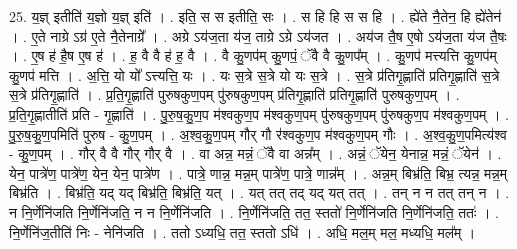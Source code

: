 \documentclass[17pt]{extarticle}
\begin{document}
25. य॒ज्ञ् इतीति॑ य॒ज्ञो य॒ज्ञ् इति॑ । . इति॒ स स इतीति॒ सः । . स हि हि स स हि । . ह्ये॑ते नै॒तेन॒ हि ह्ये॑तेन॑ । . ए॒ते नाग्रे ऽग्र॑ ए॒ते नै॒तेनाग्रे᳚ । . अग्रे ऽय॑ज॒ता य॑ज॒ ताग्रे ऽग्रे ऽय॑जत । . अय॑ज तै॒ष ए॒षो ऽय॑ज॒ता य॑ज तै॒षः । . ए॒ष ह॑ है॒ष ए॒ष ह॑ । . ह॒ वै वै ह॑ ह॒ वै । . वै कु॒णप॑म् कु॒णपं॒ ॅवै वै कु॒णप᳚म् । . कु॒णप॑ मत्त्यत्ति कु॒णप॑म् कु॒णप॑ मत्ति । . अ॒त्ति॒ यो यो᳚ ऽत्त्यत्ति॒ यः । . यः स॒त्रे स॒त्रे यो यः स॒त्रे । . स॒त्रे प्र॑तिगृ॒ह्णाति॑ प्रतिगृ॒ह्णाति॑ स॒त्रे स॒त्रे प्र॑तिगृ॒ह्णाति॑ । . प्र॒ति॒गृ॒ह्णाति॑ पुरुषकुण॒पम् पु॑रुषकुण॒पम् प्र॑तिगृ॒ह्णाति॑ प्रतिगृ॒ह्णाति॑ पुरुषकुण॒पम् । . प्र॒ति॒गृ॒ह्णातीति॑ प्रति - गृ॒ह्णाति॑ । . पु॒रु॒ष॒कु॒ण॒प म॑श्वकुण॒प म॑श्वकुण॒पम् पु॑रुषकुण॒पम् पु॑रुषकुण॒प म॑श्वकुण॒पम् । . पु॒रु॒ष॒कु॒ण॒पमिति॑ पुरुष - कु॒ण॒पम् । . अ॒श्व॒कु॒ण॒पम् गौर् गौ र॑श्वकुण॒प म॑श्वकुण॒पम् गौः । . अ॒श्व॒कु॒ण॒पमित्य॑श्व - कु॒ण॒पम् । . गौर् वै वै गौर् गौर् वै । . वा अन्न॒ मन्नं॒ ॅवै वा अन्न᳚म् । . अन्नं॒ ॅयेन॒ येनान्न॒ मन्नं॒ ॅयेन॑ । . येन॒ पात्रे॑ण॒ पात्रे॑ण॒ येन॒ येन॒ पात्रे॑ण । . पात्रे॒ णान्न॒ मन्न॒म् पात्रे॑ण॒ पात्रे॒ णान्न᳚म् । . अन्न॒म् बिभ्र॑ति॒ बिभ्र॒ त्यन्न॒ मन्न॒म् बिभ्र॑ति । . बिभ्र॑ति॒ यद् यद् बिभ्र॑ति॒ बिभ्र॑ति॒ यत् । . यत् तत् तद् यद् यत् तत् । . तन् न न तत् तन् न । . न नि॒र्णेनि॑जति नि॒र्णेनि॑जति॒ न न नि॒र्णेनि॑जति । . नि॒र्णेनि॑जति॒ तत॒ स्ततो॑ नि॒र्णेनि॑जति नि॒र्णेनि॑जति॒ ततः॑ । . नि॒र्णेनि॑ज॒तीति॑ निः - नेनि॑जति । . ततो ऽध्यधि॒ तत॒ स्ततो ऽधि॑ । . अधि॒ मल॒म् मल॒ मध्यधि॒ मल᳚म् । \newline
\end{document}
